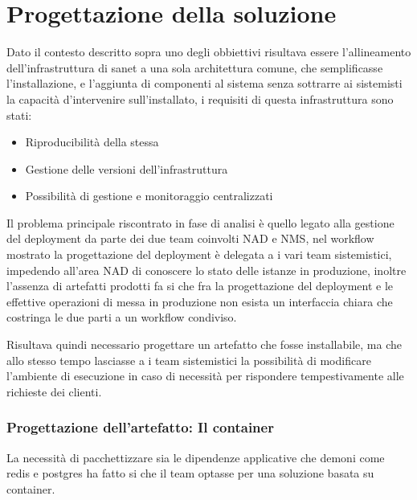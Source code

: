 \chapter{Progettazione della soluzione}

Dato il contesto descritto sopra uno degli obbiettivi risultava essere l'allineamento dell'infrastruttura di sanet a una sola architettura comune, che semplificasse l'installazione, e l'aggiunta di componenti al sistema senza sottrarre ai sistemisti la capacità d'intervenire sull'installato, i requisiti di questa infrastruttura sono stati:

\begin{itemize}
\item{Riproducibilità della stessa}
\item{Gestione delle versioni dell'infrastruttura}
\item{Possibilità di gestione e monitoraggio centralizzati}
\end{itemize}

Il problema principale riscontrato in fase di analisi è quello legato alla gestione del deployment da parte dei due team coinvolti NAD e NMS, nel workflow mostrato la progettazione del deployment è delegata a i vari team sistemistici, impedendo all'area NAD di conoscere lo stato delle istanze in produzione, inoltre l'assenza di artefatti prodotti fa si che fra la progettazione del deployment e le effettive operazioni di messa in produzione non esista un interfaccia chiara che costringa le due parti a un workflow condiviso.

Risultava quindi necessario progettare un artefatto che fosse installabile, ma che allo stesso tempo lasciasse a i team sistemistici la possibilità di modificare l'ambiente di esecuzione in caso di necessità per rispondere tempestivamente alle richieste dei clienti.

\newpage
\subsection{Progettazione dell'artefatto: Il container}

La necessità di pacchettizzare sia le dipendenze applicative che demoni come redis e postgres ha fatto si che il team optasse per una soluzione basata su container.

